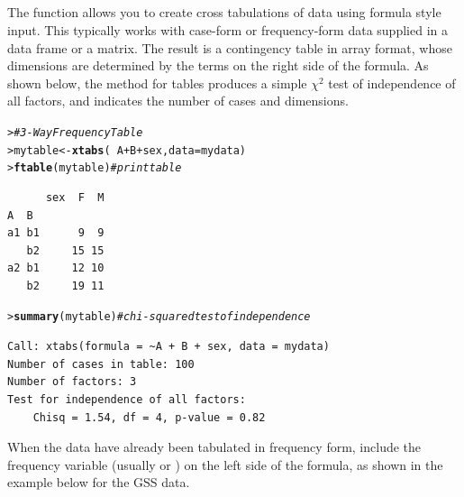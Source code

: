 \documentclass[10pt,krantz2]{krantz}\usepackage[]{graphicx}\usepackage[]{color}
\makeatletter
\newcommand{\hlcom}[1]{\textcolor[rgb]{0.678,0.584,0.686}{\textit{#1}}}%
\newcommand{\hlopt}[1]{\textcolor[rgb]{0,0,0}{#1}}%
\newcommand{\hlstd}[1]{\textcolor[rgb]{0.345,0.345,0.345}{#1}}%
\newcommand{\hlkwb}[1]{\textcolor[rgb]{0.69,0.353,0.396}{#1}}%
\newcommand{\hlkwc}[1]{\textcolor[rgb]{0.333,0.667,0.333}{#1}}%
\newcommand{\hlkwd}[1]{\textcolor[rgb]{0.737,0.353,0.396}{\textbf{#1}}}%
\newenvironment{kframe}{%
 \def\at@end@of@kframe{}%
 \ifinner\ifhmode%
  \def\at@end@of@kframe{\end{minipage}}%
  \begin{minipage}{\columnwidth}%
 \fi\fi%
 \def\FrameCommand##1{\hskip\@totalleftmargin \hskip-\fboxsep
 \colorbox{shadecolor}{##1}\hskip-\fboxsep
     \hskip-\linewidth \hskip-\@totalleftmargin \hskip\columnwidth}%
 \MakeFramed {\advance\hsize-\width
   \@totalleftmargin\z@ \linewidth\hsize
   \@setminipage}}%
 {\par\unskip\endMakeFramed%
 \at@end@of@kframe}
\newenvironment{knitrout}{}{} %
\renewenvironment{knitrout}{\small\renewcommand{\baselinestretch}{.85}}{} %
\makeatother
\begin{document}
\subsection[xtabs()]{}\label{sec:xtabs}

The  function allows you to create cross tabulations of data using formula style input.
This typically works with case-form or frequency-form data
supplied in a data frame or a matrix.
The result is a contingency table in array format, whose dimensions are determined by the terms on the right side of the formula.  As shown below, the  method
for tables produces a simple $\chi^2$ test of independence of all
factors, and indicates the number of cases and dimensions.

\begin{knitrout}
\color{fgcolor}\begin{kframe}
\begin{alltt}
\hlstd{> }\hlcom{# 3-Way Frequency Table}
\hlstd{> }\hlstd{mytable} \hlkwb{<-} \hlkwd{xtabs}\hlstd{(}\hlopt{~} \hlstd{A} \hlopt{+} \hlstd{B} \hlopt{+} \hlstd{sex,} \hlkwc{data} \hlstd{= mydata)}
\hlstd{> }\hlkwd{ftable}\hlstd{(mytable)}    \hlcom{# print table}
\end{alltt}
\begin{verbatim}
      sex  F  M
A  B           
a1 b1      9  9
   b2     15 15
a2 b1     12 10
   b2     19 11
\end{verbatim}
\begin{alltt}
\hlstd{> }\hlkwd{summary}\hlstd{(mytable)}   \hlcom{# chi-squared test of independence}
\end{alltt}
\begin{verbatim}
Call: xtabs(formula = ~A + B + sex, data = mydata)
Number of cases in table: 100 
Number of factors: 3 
Test for independence of all factors:
	Chisq = 1.54, df = 4, p-value = 0.82
\end{verbatim}
\end{kframe}
\end{knitrout}

When the data have already been tabulated in frequency form, include the
frequency variable (usually  or )
on the left side of the formula, as shown in the example below for the GSS data.
\end{document}
